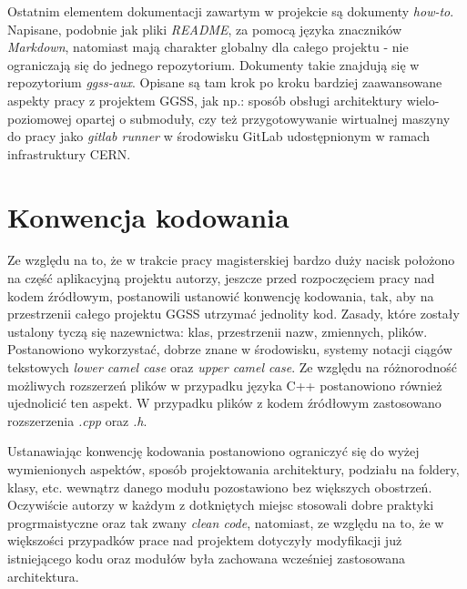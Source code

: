 Ostatnim elementem dokumentacji zawartym w projekcie są dokumenty \emph{how-to}. Napisane, podobnie jak pliki \emph{README}, za pomocą języka znaczników \emph{Markdown}, natomiast mają charakter globalny dla całego projektu - nie ograniczają się do jednego repozytorium. Dokumenty takie znajdują się w repozytorium \emph{ggss-aux}. Opisane są tam krok po kroku bardziej zaawansowane aspekty pracy z projektem GGSS, jak np.: sposób obsługi architektury wielo-poziomowej opartej o submoduły, czy też przygotowywanie wirtualnej maszyny do pracy jako \emph{gitlab runner} w środowisku GitLab udostępnionym w ramach infrastruktury CERN.

\section{Konwencja kodowania}


Ze względu na to, że w trakcie pracy magisterskiej bardzo duży nacisk położono na część aplikacyjną projektu autorzy, jeszcze przed rozpoczęciem pracy nad kodem źródłowym, postanowili ustanowić konwencję kodowania, tak, aby na przestrzenii całego projektu GGSS utrzymać jednolity kod. Zasady, które zostały ustalony tyczą się nazewnictwa: klas, przestrzenii nazw, zmiennych, plików. Postanowiono wykorzystać, dobrze znane w środowisku, systemy notacji ciągów tekstowych \emph{lower camel case} oraz \emph{upper camel case}. Ze względu na różnorodność możliwych rozszerzeń plików w przypadku języka C++ postanowiono również ujednolicić ten aspekt. W przypadku plików z kodem źródłowym zastosowano rozszerzenia \emph{.cpp} oraz \emph{.h}.

Ustanawiając konwencję kodowania postanowiono ograniczyć się do wyżej wymienionych aspektów, sposób projektowania architektury, podziału na foldery, klasy, etc. wewnątrz danego modułu pozostawiono bez większych obostrzeń. Oczywiście autorzy w każdym z dotkniętych miejsc stosowali dobre praktyki progrmaistyczne oraz tak zwany \emph{clean code}, natomiast, ze względu na to, że w większości przypadków prace nad projektem dotyczyły modyfikacji już istniejącego kodu oraz modułów była zachowana wcześniej zastosowana architektura.

